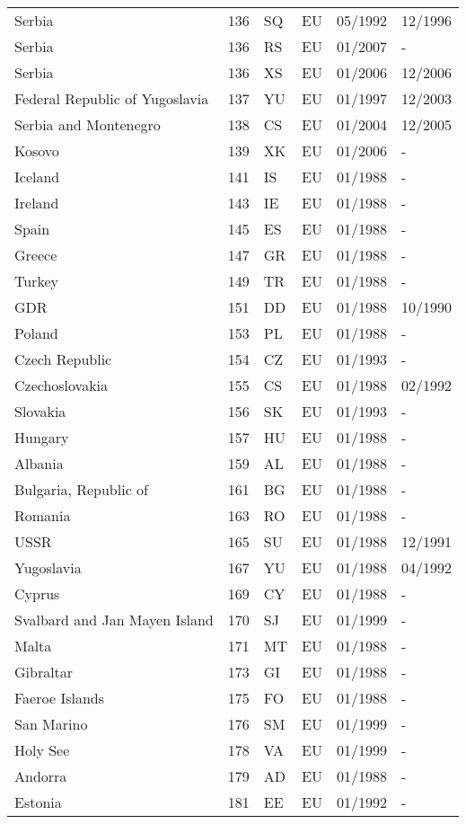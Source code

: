 \begin{small}
\begin{longtable}{p{4.3cm}p{1.5cm}p{1.5cm}p{1cm}p{2cm}p{2cm}}
Serbia	&	136	&	SQ	&	EU	&	05/1992	&	12/1996	\\
Serbia	&	136	&	RS	&	EU	&	01/2007	&	-	\\
Serbia	&	136	&	XS	&	EU	&	01/2006	&	12/2006	\\
Federal Republic of Yugoslavia	&	137	&	YU	&	EU	&	01/1997	&	12/2003	\\
Serbia and Montenegro	&	138	&	CS	&	EU	&	01/2004	&	12/2005	\\
Kosovo	&	139	&	XK	&	EU	&	01/2006	&	-	\\
Iceland	&	141	&	IS	&	EU	&	01/1988	&	-	\\
Ireland	&	143	&	IE	&	EU	&	01/1988	&	-	\\
Spain	&	145	&	ES	&	EU	&	01/1988	&	-	\\
Greece	&	147	&	GR	&	EU	&	01/1988	&	-	\\
Turkey	&	149	&	TR	&	EU	&	01/1988	&	-	\\
GDR	&	151	&	DD	&	EU	&	01/1988	&	10/1990	\\
Poland	&	153	&	PL	&	EU	&	01/1988	&	-	\\
Czech Republic	&	154	&	CZ	&	EU	&	01/1993	&	-	\\
Czechoslovakia	&	155	&	CS	&	EU	&	01/1988	&	02/1992	\\
Slovakia	&	156	&	SK	&	EU	&	01/1993	&	-	\\
Hungary	&	157	&	HU	&	EU	&	01/1988	&	-	\\
Albania	&	159	&	AL	&	EU	&	01/1988	&	-	\\
Bulgaria, Republic of	&	161	&	BG	&	EU	&	01/1988	&	-	\\
Romania	&	163	&	RO	&	EU	&	01/1988	&	-	\\
USSR	&	165	&	SU	&	EU	&	01/1988	&	12/1991	\\
Yugoslavia	&	167	&	YU	&	EU	&	01/1988	&	04/1992	\\
Cyprus	&	169	&	CY	&	EU	&	01/1988	&	-	\\
Svalbard and Jan Mayen Island	&	170	&	SJ	&	EU	&	01/1999	&	-	\\
Malta	&	171	&	MT	&	EU	&	01/1988	&	-	\\
Gibraltar	&	173	&	GI	&	EU	&	01/1988	&	-	\\
Faeroe Islands	&	175	&	FO	&	EU	&	01/1988	&	-	\\
San Marino	&	176	&	SM	&	EU	&	01/1999	&	-	\\
Holy See	&	178	&	VA	&	EU	&	01/1999	&	-	\\
Andorra	&	179	&	AD	&	EU	&	01/1988	&	-	\\
Estonia	&	181	&	EE	&	EU	&	01/1992	&	-	\\

\end{longtable}
\end{small}
